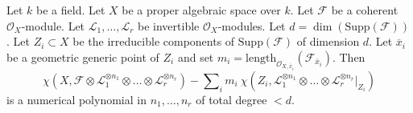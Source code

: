 \begin{lemma}
\label{lemma-numerical-polynomial-leading-term}
Let $k$ be a field. Let $X$ be a proper algebraic space over $k$. Let
$\mathcal{F}$ be a coherent $\mathcal{O}_X$-module. Let
$\mathcal{L}_1, \ldots, \mathcal{L}_r$ be invertible $\mathcal{O}_X$-modules.
Let $d = \dim(\text{Supp}(\mathcal{F}))$.
Let $Z_i \subset X$ be the irreducible components
of $\text{Supp}(\mathcal{F})$ of dimension $d$. Let $\overline{x}_i$
be a geometric generic point of $Z_i$ and set
$m_i = \text{length}_{\mathcal{O}_{X, \overline{x}_i}}
(\mathcal{F}_{\overline{x}_i})$.
Then
$$
\chi(X, \mathcal{F} \otimes \mathcal{L}_1^{\otimes n_1} \otimes \ldots \otimes
\mathcal{L}_r^{\otimes n_r}) -
\sum\nolimits_i
m_i\ \chi(Z_i, \mathcal{L}_1^{\otimes n_1} \otimes \ldots \otimes
\mathcal{L}_r^{\otimes n_r}|_{Z_i})
$$
is a numerical polynomial in $n_1, \ldots, n_r$ of total degree $< d$.
\end{lemma}

